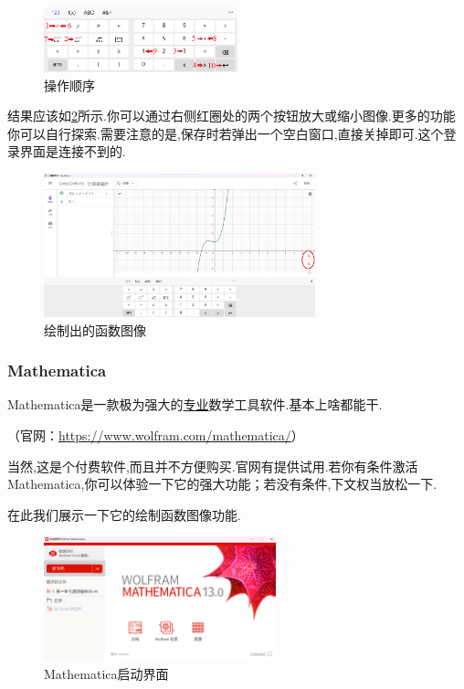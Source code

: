 \documentclass[lang=cn,math=cm,chinesefont=nofont,11pt,scheme=chinese,twocol]{elegantbook}
\begin{document}
\begin{figure}[h]
  \centering
  \includegraphics[width=0.5\textwidth]{image/geogebra3.png}
  \caption{操作顺序}
  \label{img:geogebra3}
\end{figure}

结果应该如\ref{img:geogebra4}所示.你可以通过右侧红圈处的两个按钮放大或缩小图像.更多的功能你可以自行探索.需要注意的是,保存时若弹出一个空白窗口,直接关掉即可.这个登录界面是连接不到的.

\begin{figure}[h]
  \centering
  \includegraphics[width=0.7\textwidth]{image/geogebra4.png}
  \caption{绘制出的函数图像}
  \label{img:geogebra4}
\end{figure}

\subsubsection{Mathematica}

Mathematica是一款极为强大的\underline{专业}数学工具软件.基本上啥都能干.

（官网：\href{https://www.wolfram.com/mathematica/}{https://www.wolfram.com/mathematica/}）

当然,这是个付费软件,而且并不方便购买.官网有提供试用.若你有条件激活Mathematica,你可以体验一下它的强大功能；若没有条件,下文权当放松一下.

在此我们展示一下它的绘制函数图像功能.

\begin{figure}[h]
  \centering
  \includegraphics[width=0.6\textwidth]{image/mathematica1.png}
  \caption{Mathematica启动界面}
  \label{img:mathematica1}
\end{figure}
\end{document}
